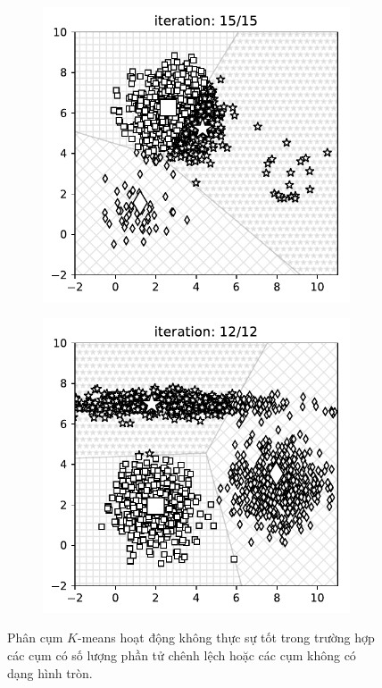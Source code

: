 \begin{figure}[t]
    \begin{subfigure}{0.49\textwidth}
   
    \includegraphics[width=0.8\linewidth]{ebookML_src/src/kmeans/skew_10.pdf}
    \caption{}
    \label{fig:4_disa}
    \end{subfigure}
    \begin{subfigure}{0.49\textwidth}
   
    \includegraphics[width=0.8\linewidth]{ebookML_src/src/kmeans/notround_10.pdf}
    \caption{}
    \label{fig:4_disb}
    \end{subfigure}
    \caption{
     Phân cụm $K$-means hoạt động không thực sự tốt trong trường hợp các
     cụm có số lượng phần tử chênh lệch hoặc các cụm không có dạng
     hình tròn. 
    }
    \label{fig:4_dis}
\end{figure}



